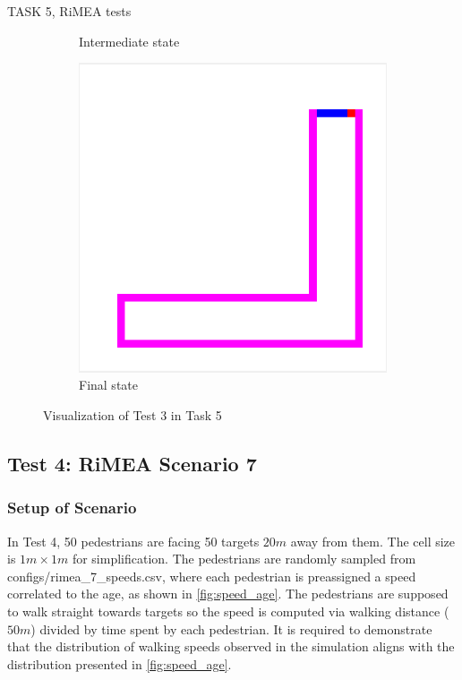 \documentclass[10pt,a4paper]{article}
\begin{document}
\begin{task}{TASK 5, RiMEA tests}
\begin{figure}[htbp]
\begin{subfigure}[b]{0.31\textwidth}
    \caption{Intermediate state}
    \label{fig:test3_intermediate}
  \end{subfigure}
  \begin{subfigure}[b]{0.31\textwidth}
    \includegraphics[width=\textwidth]{pictures/test3_end.png}
    \caption{Final state}
    \label{fig:test3_end}
  \end{subfigure}
  \caption{Visualization of Test 3 in Task 5}
  \label{fig:test3}
\end{figure}

\subsection{Test 4: RiMEA Scenario 7}

\subsubsection{Setup of Scenario}

In Test 4, 50 pedestrians are facing 50 targets $20m$ away from them. The cell size is $1m \times 1m$ for simplification. The pedestrians are randomly sampled from configs/rimea\_7\_speeds.csv, where each pedestrian is preassigned a speed correlated to the age, as shown in \autoref{fig:speed_age}\cite{weidmann1993transporttechnik}. The pedestrians are supposed to walk straight towards targets so the speed is computed via walking distance ($50m$) divided by time spent by each pedestrian. It is required to demonstrate that the distribution of walking speeds observed in the simulation aligns with the distribution presented in \autoref{fig:speed_age}.


\end{task}
\end{document}
